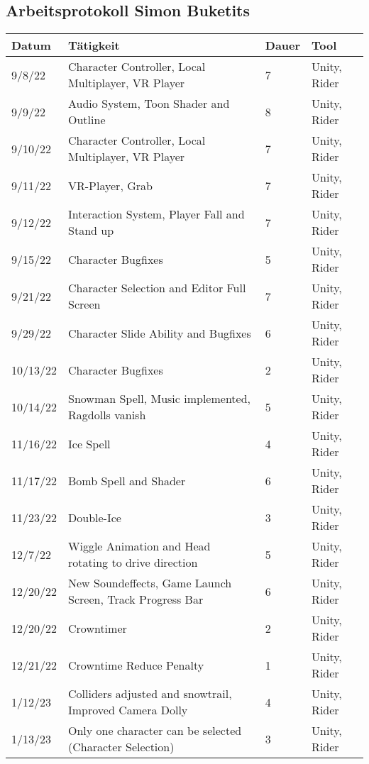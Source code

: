 \subsection{Arbeitsprotokoll Simon Buketits}

\begin{longtable}{|p{1.5cm}|p{6cm}|p{1.2cm}|p{2.7cm}|}
	\hline
	\textbf{Datum} & \textbf{Tätigkeit} & \textbf{Dauer} & \textbf{Tool} \\ \hline
	\endhead
	9/8/22 & Character Controller, Local Multiplayer, VR Player & 7 & Unity, Rider \\ \hline
	9/9/22 & Audio System, Toon Shader and Outline & 8 & Unity, Rider \\ \hline
	9/10/22 & Character Controller, Local Multiplayer, VR Player & 7 & Unity, Rider \\ \hline
	9/11/22 & VR-Player, Grab & 7 & Unity, Rider \\ \hline
	9/12/22 & Interaction System, Player Fall and Stand up & 7 & Unity, Rider \\ \hline
	9/15/22 & Character Bugfixes & 5 & Unity, Rider \\ \hline
	9/21/22 & Character Selection and Editor Full Screen & 7 & Unity, Rider \\ \hline
	9/29/22 & Character Slide Ability and Bugfixes & 6 & Unity, Rider \\ \hline
	10/13/22 & Character Bugfixes & 2 & Unity, Rider \\ \hline
	10/14/22 & Snowman Spell, Music implemented, Ragdolls vanish & 5 & Unity, Rider \\ \hline
	11/16/22 & Ice Spell & 4 & Unity, Rider \\ \hline
	11/17/22 & Bomb Spell and Shader & 6 & Unity, Rider \\ \hline
	11/23/22 & Double-Ice & 3 & Unity, Rider \\ \hline
	12/7/22 & Wiggle Animation and Head rotating to drive direction & 5 & Unity, Rider \\ \hline
	12/20/22 & New Soundeffects, Game Launch Screen, Track Progress Bar & 6 & Unity, Rider \\ \hline
	12/20/22 & Crowntimer & 2 & Unity, Rider \\ \hline
	12/21/22 & Crowntime Reduce Penalty & 1 & Unity, Rider \\ \hline
	1/12/23 & Colliders adjusted and snowtrail, Improved Camera Dolly & 4 & Unity, Rider \\ \hline
	1/13/23 & Only one character can be selected (Character Selection) & 3 & Unity, Rider \\ \hline

\end{longtable}
